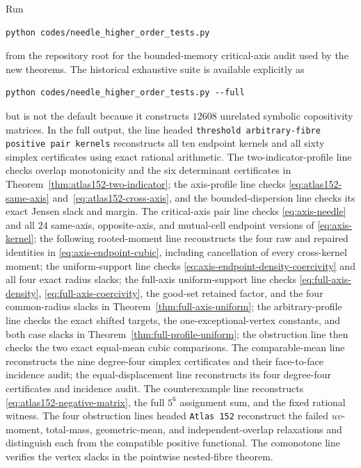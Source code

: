 \documentclass[11pt]{article}
\begin{document}
Run
\begin{verbatim}
python codes/needle_higher_order_tests.py
\end{verbatim}
from the repository root for the bounded-memory critical-axis audit used by
the new theorems.  The historical exhaustive suite is available explicitly
as
\begin{verbatim}
python codes/needle_higher_order_tests.py --full
\end{verbatim}
but is not the default because it constructs $12608$ unrelated symbolic
copositivity matrices.  In the full output, the line headed
\texttt{threshold arbitrary-fibre positive pair kernels} reconstructs all
ten endpoint kernels and all sixty simplex certificates using exact rational
arithmetic.  The two-indicator-profile line checks overlap monotonicity and
the six determinant certificates in
Theorem~\ref{thm:atlas152-two-indicator}; the axis-profile line checks
\eqref{eq:atlas152-same-axis} and~\eqref{eq:atlas152-cross-axis}, and the
bounded-dispersion line checks its exact Jensen slack and margin.  The
critical-axis pair line checks \eqref{eq:axis-needle} and all $24$ same-axis,
opposite-axis, and mutual-cell endpoint versions of
\eqref{eq:axis-kernel}; the following rooted-moment line reconstructs the
four raw and repaired identities in
\eqref{eq:axis-endpoint-cubic}, including cancellation of every cross-kernel
moment; the uniform-support line checks
\eqref{eq:axis-endpoint-density-coercivity} and all four exact radius slacks;
the full-axis uniform-support line checks \eqref{eq:full-axis-density},
\eqref{eq:full-axis-coercivity}, the good-set retained factor, and the four
common-radius slacks in Theorem~\ref{thm:full-axis-uniform};
the arbitrary-profile line checks the exact shifted targets, the
one-exceptional-vertex constants, and both case slacks in
Theorem~\ref{thm:full-profile-uniform};
the obstruction line then checks the two exact equal-mean cubic
comparisons.  The
comparable-mean line reconstructs the nine degree-four simplex certificates
and their face-to-face incidence audit; the equal-displacement line
reconstructs its four degree-four certificates and incidence audit.  The
counterexample line reconstructs \eqref{eq:atlas152-negative-matrix}, the
full $5^6$ assignment sum, and the fixed rational witness.  The four
obstruction lines headed
\texttt{Atlas 152} reconstruct the failed $uv$-moment,
total-mass, geometric-mean, and independent-overlap relaxations and
distinguish each from the compatible positive functional.  The comonotone
line verifies the vertex slacks in the pointwise nested-fibre theorem.
\end{document}

